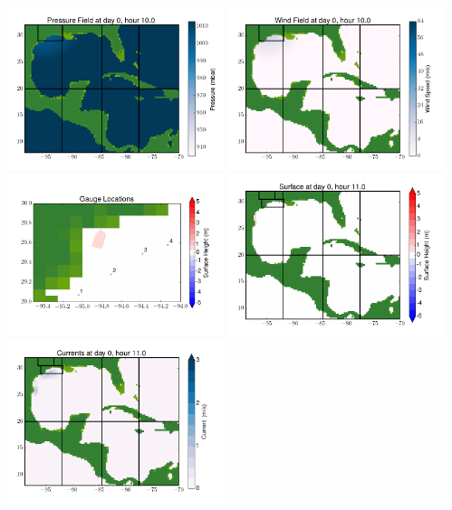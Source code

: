 \documentclass[11pt]{article}
\begin{document}
\includegraphics[width=0.475\textwidth]{frame0082fig8.png}
\vskip 10pt 
\includegraphics[width=0.475\textwidth]{frame0082fig9.png}
\includegraphics[width=0.475\textwidth]{frame0082fig10.png}
\vskip 10pt 
\includegraphics[width=0.475\textwidth]{frame0083fig1.png}
\includegraphics[width=0.475\textwidth]{frame0083fig2.png}
\end{document}
